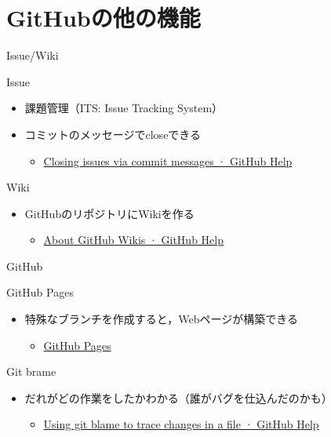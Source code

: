 \documentclass[t, aspectratio=169]{beamer}
\begin{document}
\section{GitHubの他の機能}
\label{sec-4-3}
\begin{frame}[label=sec-4-3-1]{Issue/Wiki}
\begin{block}{Issue}
\begin{itemize}
\item 課題管理（ITS: Issue Tracking System）
\item コミットのメッセージでcloseできる
\begin{itemize}
\item \href{https://help.github.com/articles/closing-issues-via-commit-messages}{Closing issues via commit messages · GitHub Help}
\end{itemize}
\end{itemize}
\end{block}

\begin{block}{Wiki}
\begin{itemize}
\item GitHubのリポジトリにWikiを作る
\begin{itemize}
\item \href{https://help.github.com/articles/about-github-wikis}{About GitHub Wikis · GitHub Help}
\end{itemize}
\end{itemize}
\end{block}
\end{frame}

\begin{frame}[label=sec-4-3-2]{GitHub}
\begin{block}{GitHub Pages}
\begin{itemize}
\item 特殊なブランチを作成すると，Webページが構築できる
\begin{itemize}
\item \href{https://pages.github.com/}{GitHub Pages}
\end{itemize}
\end{itemize}
\end{block}

\begin{block}{Git brame}
\begin{itemize}
\item だれがどの作業をしたかわかる（誰がバグを仕込んだのかも）
\begin{itemize}
\item \href{https://help.github.com/articles/using-git-blame-to-trace-changes-in-a-file}{Using git blame to trace changes in a file · GitHub Help}
\end{itemize}
\end{itemize}
\end{block}
\end{frame}
\end{document}
